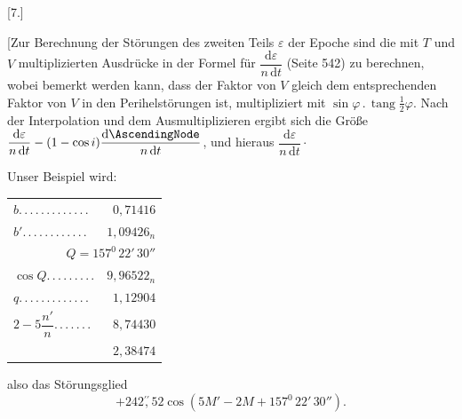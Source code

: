 \begin{landscape}
\begingroup
\fontsize{10}{13}\selectfont
{}
\renewcommand{\headrulewidth}{0pt}
\par\medskip
{}
\begin{center}[7.]\end{center}
\par\noindent\hspace*{\parindent}[Zur Berechnung der Störungen des zweiten Teils \(\varepsilon\) der Epoche sind die mit \(T\) und \(V\) multiplizierten Ausdrücke in der Formel für \(\dfrac{\mathrm{d}\varepsilon}{n\,\mathrm{d}t}\) (Seite 542) zu berechnen, wobei bemerkt werden kann, dass der Faktor von \(V\) gleich dem entsprechenden Faktor von \(V\) in den Perihelstörungen ist, multipliziert mit \(\sin\varphi\mathbin{.}\operatorname{tang}\tfrac12\varphi\). Nach der Interpolation und dem Ausmultiplizieren ergibt sich die Größe \(\dfrac{\mathrm{d}\varepsilon}{n\,\mathrm{d}t}-(1-\cos i)\dfrac{\mathrm{d}\AscendingNode}{n\,\mathrm{d}t}\), und hieraus \(\dfrac{\mathrm{d}\varepsilon}{n\,\mathrm{d}t}\mathpunct{\cdot}\)
\par\noindent\hspace*{\parindent}Unser Beispiel wird:
\par
\begingroup\small
\noindent\begin{minipage}[c]{.43\textwidth}
\begin{tabular}{@{}lr@{}}
\(b\)\enspace .\,.\,.\,.\,.\,.\,.\,.\,.\,.\,.\,.\,.&\(0{,}71416\)\\
\(b'\)\enspace .\,.\,.\,.\,.\,.\,.\,.\,.\,.\,.\,.&\(1{,}09426_n\)\\
\multicolumn{2}{r}{\(Q=157^0\,22'\,30''\)}\\
\(\cos Q\)\enspace .\,.\,.\,.\,.\,.\,.\,.\,.&\(9{,}96522_n\)\\
\(q\)\enspace .\,.\,.\,.\,.\,.\,.\,.\,.\,.\,.\,.\,.&\(1{,}12904\)\\
\(2-5\dfrac{n'}{n}\)\enspace .\,.\,.\,.\,.\,.\,.&\(8{,}74430\)\\
\hline
&\(2{,}38474\)
\end{tabular}
\end{minipage}\hfill
\begin{minipage}[c]{.55\textwidth}
also das Störungsglied
\[
+242\overset{\prime\prime}{,}52\cos(5M'-2M+157^0\,22'\,30'').
\]
\end{minipage}\par
\endgroup
\clearpage
\endgroup
\end{landscape}

